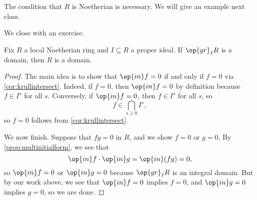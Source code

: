 \begin{remark}
	The condition that $R$ is Noetherian is necessary. We will give an example next class.
\end{remark}
We close with an exercise.
\begin{exe}
	Fix $R$ a local Noetherian ring and $I\subseteq R$ a proper ideal. If $\op{gr}_IR$ is a domain, then $R$ is a domain.
\end{exe}
\begin{proof}
	The main idea is to show that $\op{in}f=0$ if and only if $f=0$ via \autoref{cor:krullintersect}. Indeed, if $f=0$, then $\op{in}f=0$ by definition because $f\in I^s$ for all $s$. Conversely, if $\op{in}f=0$, then $f\in I^s$ for all $s$, so
	\[f\in\bigcap_{s\ge0}I^s,\]
	so $f=0$ follows from \autoref{cor:krullintersect}.

	We now finish. Suppose that $fg=0$ in $R$, and we show $f=0$ or $g=0$. By \autoref{prop:multinitialform}, we see that
	\[\op{in}f\cdot\op{in}g=\op{in}(fg)=0,\]
	so $\op{in}f=0$ or $\op{in}g=0$ because $\op{gr}_IR$ is an integral domain. But by our work above, we see that $\op{in}f=0$ implies $f=0$, and $\op{in}g=0$ implies $g=0$, so we are done.
\end{proof}
